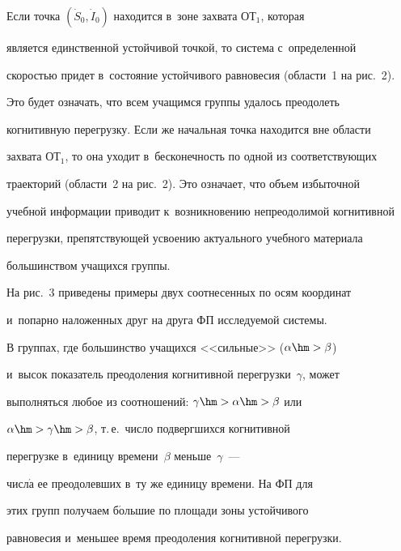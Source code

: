   


  Если точка $(\dot{S}_0, \dot{I}_0)$ находится в~зоне захвата ОТ$_1$, которая 


является единственной устойчивой точкой, то сис\-те\-ма с~определенной 


скоростью придет в~со\-сто\-яние устойчивого равновесия (области~1 на рис.~2). 


Это будет означать, что всем учащимся группы удалось преодолеть 


когнитивную перегрузку. Если же начальная точ\-ка находится вне об\-ласти 


захвата ОТ$_1$, то она уходит в~бес\-ко\-неч\-ность по одной из со\-от\-вет\-ст\-ву\-ющих 


траекторий (области~2 на рис.~2). Это означает, что объ\-ем избыточной 


учебной информации приводит к~возникновению непреодолимой когнитивной 


пе\-ре\-груз\-ки, пре\-пят\-ст\-ву\-ющей усвоению актуального учебного материала 


большинством учащихся группы. 


 


 На рис.~3 приведены примеры двух соотнесенных по осям координат 


 и~попарно наложенных друг на друга ФП ис\-сле\-ду\-емой сис\-те\-мы. 


  


  В группах, где большинство учащихся <<сильные>> ($\alpha \hm>\beta$) 


и~высок показатель преодоления когнитивной пе\-ре\-груз\-ки~$\gamma$, может 


выполняться любое из соотношений: $\gamma\hm> \alpha\hm> \beta$ или 


$\alpha\hm> \gamma \hm> \beta$, т.\,е.\ число подвергшихся когнитивной 


пе\-ре\-груз\-ке в~единицу времени~$\beta$ меньше~$\gamma$~--- 


числ$\acute{\mbox{а}}$ ее преодолевших в~ту же единицу времени. На ФП для 


этих групп получаем б$\acute{\mbox{о}}$льшие по площади зоны устойчивого 


равновесия и~меньшее время преодоления когнитивной перегрузки.


{





} 



